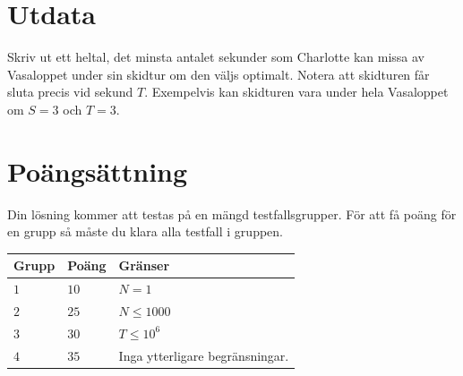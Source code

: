 \section*{Utdata}
Skriv ut ett heltal, det minsta antalet sekunder som Charlotte kan missa av Vasaloppet under sin skidtur om den väljs optimalt. 
Notera att skidturen får sluta precis vid sekund $T$. 
Exempelvis kan skidturen vara under hela Vasaloppet om $S=3$ och $T=3$.

\section*{Poängsättning}
Din lösning kommer att testas på en mängd testfallsgrupper.
För att få poäng för en grupp så måste du klara alla testfall i gruppen.

\noindent
\begin{tabular}{| l | l | p{12cm} |}
  \hline
  \textbf{Grupp} & \textbf{Poäng} & \textbf{Gränser} \\ \hline
  $1$    & $10$       & $N=1$ \\ \hline
  $2$    & $25$       & $N \leq 1000$ \\ \hline
  $3$    & $30$       & $T \leq 10^6$ \\ \hline
  $4$    & $35$       & Inga ytterligare begränsningar. \\ \hline
\end{tabular}